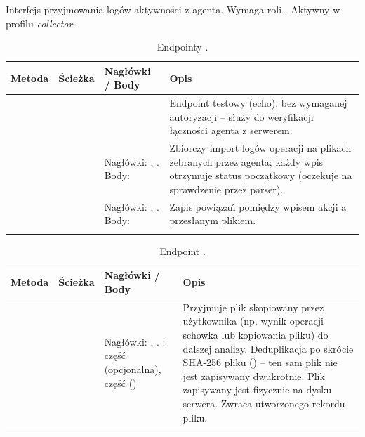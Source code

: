 Interfejs przyjmowania logów aktywności z agenta. Wymaga roli . Aktywny w profilu
\emph{collector}.

\begingroup\footnotesize
\begin{longtable}{M{1.4cm} M{2.8cm} M{5.2cm} M{5.0cm}}
\toprule
{}
\textbf{Metoda} & \textbf{Ścieżka} & \textbf{Nagłówki / Body} & \textbf{Opis} \\
\midrule
\endhead
{} &  &  &
  Endpoint testowy (echo), bez wymaganej autoryzacji -- służy do weryfikacji łączności agenta z serwerem. \\
 &  &
  Nagłówki: , . Body:  &
  Zbiorczy import logów operacji na plikach zebranych przez agenta; każdy wpis otrzymuje status
  początkowy  (oczekuje na sprawdzenie przez parser). \\
 &  &
  Nagłówki: , . Body:  &
  Zapis powiązań pomiędzy wpisem akcji a przesłanym plikiem. \\
\bottomrule
\caption{Endpointy .}
\end{longtable}
\endgroup


\begingroup\footnotesize
\begin{longtable}{M{1.4cm} M{2.8cm} M{5.2cm} M{5.0cm}}
\toprule
{}
\textbf{Metoda} & \textbf{Ścieżka} & \textbf{Nagłówki / Body} & \textbf{Opis} \\
\midrule
\endhead
{} &  &
  Nagłówki: , . : część  (opcjonalna),
  część  () &
  Przyjmuje plik skopiowany przez użytkownika (np. wynik operacji schowka lub kopiowania pliku)
  do dalszej analizy. Deduplikacja po skrócie SHA-256 pliku () -- ten sam plik nie
  jest zapisywany dwukrotnie. Plik zapisywany jest fizycznie na dysku serwera. Zwraca 
  utworzonego rekordu pliku. \\
\bottomrule
\caption{Endpoint .}
\end{longtable}
\endgroup


